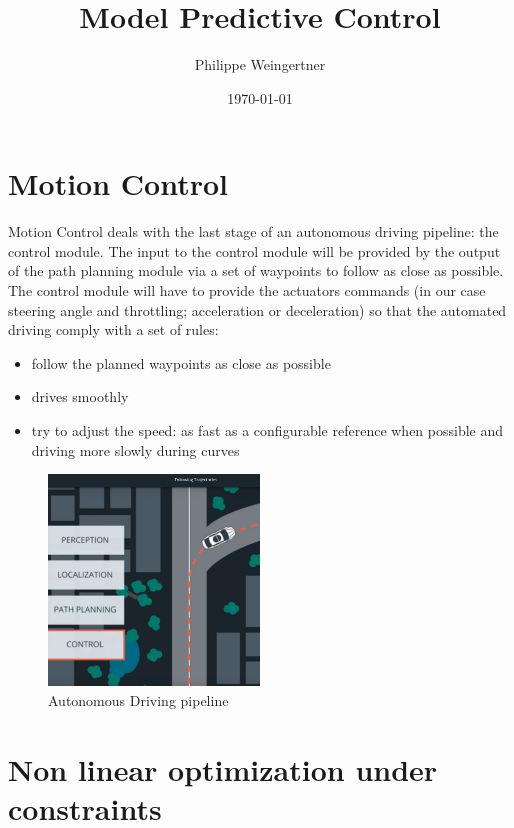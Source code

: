 \documentclass[11pt]{article}
\begin{document}
\title{Model Predictive Control}
\author{Philippe Weingertner}
\date{\today}
\maketitle

\tableofcontents

\section{Motion Control}

Motion Control deals with the last stage of an autonomous driving pipeline: the control module.
The input to the control module will be provided by the output of the path planning module via a set of waypoints to follow as close as possible.
The control module will have to provide the actuators commands (in our case steering angle and throttling; acceleration or deceleration) so that the automated driving comply with a set of rules:


\begin{itemize}
\item follow the planned waypoints as close as possible
\item drives smoothly
\item try to adjust the speed: as fast as a configurable reference when possible and driving more slowly during curves
\end{itemize}



\begin{figure}[h]
    \centering
    \includegraphics[width=0.5\textwidth]{pipeline}
    \caption{Autonomous Driving pipeline}
    \label{fig:pipeline}
\end{figure}

\section{Non linear optimization under constraints}
\end{document}
